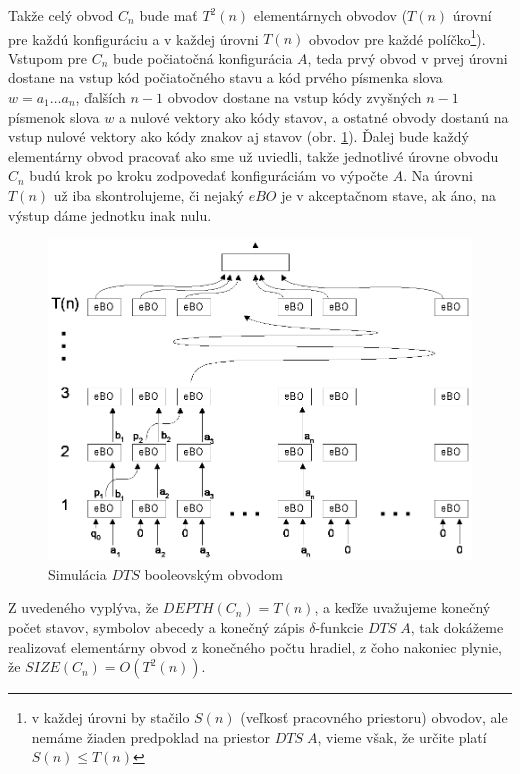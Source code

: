 {\begin{dokaz}
  Takže celý obvod $C_n$ bude mať $T^2(n)$ elementárnych obvodov
  ($T(n)$ úrovní pre každú kon\-fi\-gu\-rá\-ciu a v každej úrovni
  $T(n)$ obvodov pre každé políčko\footnote{v každej úrovni by
  stačilo $S(n)$ (veľkosť pracovného priestoru) obvodov, ale nemáme
  žiaden predpoklad na priestor $DTS\; A$, vieme však, že určite
  platí $S(n)\leq T(n)$ }). Vstupom pre $C_n$ bude počiatočná
  konfigurácia $A$, teda prvý obvod v prvej úrovni dostane na vstup
  kód počiatočného stavu a kód prvého písmenka slova $w=a_1\dots
  a_n$, ďalších $n-1$ obvodov dostane na vstup kódy zvyšných $n-1$
  písmenok slova $w$ a nulové vektory ako kódy stavov, a ostatné
  obvody dostanú na \mbox{vstup} nulové vektory ako kódy znakov aj
  stavov (obr. \ref{bo_obr_tsbo3}). Ďalej bude každý elementárny obvod pracovať
  ako sme už uviedli, takže jednotlivé úrovne obvodu $C_n$ budú krok
  po kroku zodpovedať konfiguráciám vo výpočte $A$. Na úrovni $T(n)$
  už iba skontrolujeme, či nejaký $eBO$ je v akceptačnom stave, ak
  áno, na výstup dáme jednotku inak nulu.

  \begin{figure}[!ht]
    \centering
    \includegraphics{img/bo/tsbo3}
    \caption{Simulácia $DTS$ booleovským obvodom} \label{bo_obr_tsbo3}
  \end{figure}

  Z uvedeného vyplýva, že $DEPTH(C_n)=T(n)$, a keďže uvažujeme
  konečný počet stavov, symbolov abecedy a konečný zápis
  $\delta$-funkcie $DTS\; A$, tak dokážeme realizovať elementárny
  obvod z konečného počtu hradiel, z čoho nakoniec plynie, že
  $SIZE(C_n)=O(T^2(n))$.


\end{dokaz}}
